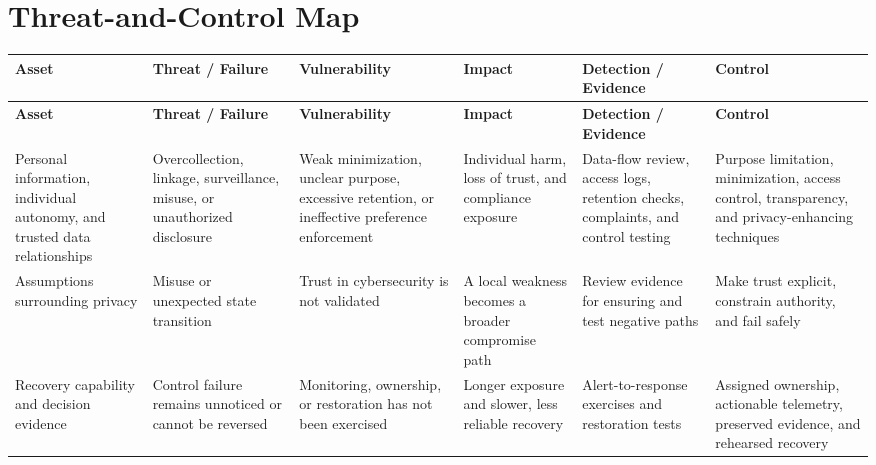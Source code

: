 \documentclass[11pt,letterpaper]{article}
\begin{document}
\section*{Threat-and-Control Map}
\begingroup\scriptsize\setlength{\tabcolsep}{2pt}
\begin{longtable}{>{\raggedright\arraybackslash}p{}>{\raggedright\arraybackslash}p{}>{\raggedright\arraybackslash}p{}>{\raggedright\arraybackslash}p{}>{\raggedright\arraybackslash}p{}>{\raggedright\arraybackslash}p{}}
\toprule\rowcolor{Navy}\color{white}\textbf{Asset} & \color{white}\textbf{Threat / Failure} & \color{white}\textbf{Vulnerability} & \color{white}\textbf{Impact} & \color{white}\textbf{Detection / Evidence} & \color{white}\textbf{Control}\\\midrule
\endfirsthead
\toprule\rowcolor{Navy}\color{white}\textbf{Asset} & \color{white}\textbf{Threat / Failure} & \color{white}\textbf{Vulnerability} & \color{white}\textbf{Impact} & \color{white}\textbf{Detection / Evidence} & \color{white}\textbf{Control}\\\midrule
\endhead
Personal information, individual autonomy, and trusted data relationships & Overcollection, linkage, surveillance, misuse, or unauthorized disclosure & Weak minimization, unclear purpose, excessive retention, or ineffective preference enforcement & Individual harm, loss of trust, and compliance exposure & Data-flow review, access logs, retention checks, complaints, and control testing & Purpose limitation, minimization, access control, transparency, and privacy-enhancing techniques\\\midrule
Assumptions surrounding privacy & Misuse or unexpected state transition & Trust in cybersecurity is not validated & A local weakness becomes a broader compromise path & Review evidence for ensuring and test negative paths & Make trust explicit, constrain authority, and fail safely\\\midrule
Recovery capability and decision evidence & Control failure remains unnoticed or cannot be reversed & Monitoring, ownership, or restoration has not been exercised & Longer exposure and slower, less reliable recovery & Alert-to-response exercises and restoration tests & Assigned ownership, actionable telemetry, preserved evidence, and rehearsed recovery\\\midrule
\bottomrule
\end{longtable}
\endgroup
\end{document}
